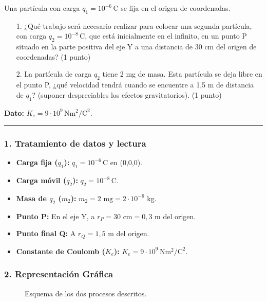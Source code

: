 \begin{cajaenunciado}
Una partícula con carga $q_1=10^{-6}\,\text{C}$ se fija en el origen de coordenadas.
\begin{enumerate}
    \item[1.] ¿Qué trabajo será necesario realizar para colocar una segunda partícula, con carga $q_2=10^{-8}\,\text{C}$, que está inicialmente en el infinito, en un punto P situado en la parte positiva del eje Y a una distancia de 30 cm del origen de coordenadas? (1 punto)
    \item[2.] La partícula de carga $q_2$ tiene 2 mg de masa. Esta partícula se deja libre en el punto P, ¿qué velocidad tendrá cuando se encuentre a 1,5 m de distancia de $q_1$? (suponer despreciables los efectos gravitatorios). (1 punto)
\end{enumerate}
\textbf{Dato:} $K_e=9\cdot10^9\,\text{N}\text{m}^2/\text{C}^2$.
\end{cajaenunciado}
\hrule

\subsubsection*{1. Tratamiento de datos y lectura}
\begin{itemize}
    \item \textbf{Carga fija ($q_1$):} $q_1=10^{-6}\,\text{C}$ en (0,0,0).
    \item \textbf{Carga móvil ($q_2$):} $q_2=10^{-8}\,\text{C}$.
    \item \textbf{Masa de $q_2$ ($m_2$):} $m_2 = 2 \text{ mg} = 2 \cdot 10^{-6}$ kg.
    \item \textbf{Punto P:} En el eje Y, a $r_P = 30 \text{ cm} = 0,3$ m del origen.
    \item \textbf{Punto final Q:} A $r_Q = 1,5$ m del origen.
    \item \textbf{Constante de Coulomb ($K_e$):} $K_e=9\cdot10^9\,\text{N}\text{m}^2/\text{C}^2$.
\end{itemize}

\subsubsection*{2. Representación Gráfica}
\begin{figure}[H]
    \centering
    \caption{Esquema de los dos procesos descritos.}
\end{figure}

